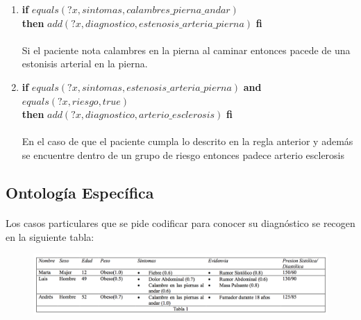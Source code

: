 \documentclass[10pt, a4paper,spanish]{article}
\begin{document}
\begin{enumerate}[label={\textbf{R\theenumi:}}]
				\item
					\textbf{if} $equals(?x, sintomas, calambres\_pierna\_andar)$ \\
					\textbf{then} $add(?x, diagnostico, estenosis\_arteria\_pierna)$ \textbf{fi}
					\\ \\
					Si el paciente nota calambres en la pierna al caminar entonces pacede de una estonisis arterial en la pierna.

				\item
					\textbf{if} $equals(?x, sintomas, estenosis\_arteria\_pierna)$ \textbf{and} $equals(?x, riesgo, true)$ \\
					\textbf{then} $add(?x, diagnostico, arterio\_esclerosis)$ \textbf{fi}
					\\ \\
					En el caso de que el paciente cumpla lo descrito en la regla anterior y además se encuentre dentro de un grupo de riesgo entonces padece arterio esclerosis
			\end{enumerate}

		\subsection{Ontología Específica}

			\paragraph{}
			Los casos particulares que se pide codificar para conocer su diagnóstico se recogen en la siguiente tabla:

			\begin{figure}[H]
				\begin{center}
					\includegraphics[width=\textwidth]{table-1}
				\end{center}
			\end{figure}
\end{document}
